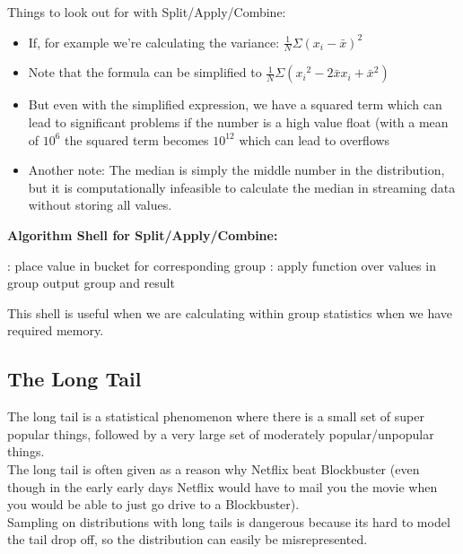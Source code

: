 Things to look out for with Split/Apply/Combine:
\begin{itemize}
	\item If, for example we're calculating the variance: $\frac{1}{N}\Sigma(x_i - \bar{x})^2$ 
    \item Note that the formula can be simplified to $\frac{1}{N}\Sigma({x_i}^2 - 2\bar{x}x_i + \bar{x}^2)$
    \item But even with the simplified expression, we have a squared term which can lead to significant problems if the number is a high value float (with a mean of $10^6$ the squared term becomes $10^12$ which can lead to overflows
    \item Another note: The median is simply the middle number in the distribution, but it is computationally infeasible to calculate the median in streaming data without storing all values.
\end{itemize}

\newpage

\textbf{Algorithm Shell for Split/Apply/Combine:}

\begin{algorithmic}
	:
		\State place value in bucket for corresponding group
    \EndFor
    :
    	\State apply function over values in group
        \State output group and result
	\EndFor
\end{algorithmic}

This shell is useful when we are calculating within group statistics when we have required memory.


\subsection{The Long Tail}
The long tail is a statistical phenomenon where there is a small set of super popular things, followed by a very large set of moderately popular/unpopular things.\\
The long tail is often given as a reason why Netflix beat Blockbuster (even though in the early early days Netflix would have to mail you the movie when you would be able to just go drive to a Blockbuster).\\
Sampling on distributions with long tails is dangerous because its hard to model the tail drop off, so the distribution can easily be misrepresented.
\vspace{5mm}

